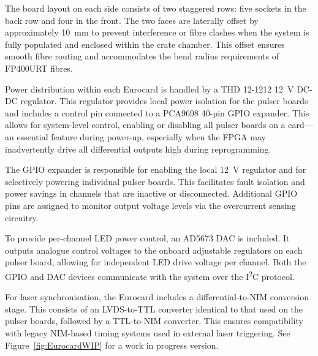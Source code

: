 \documentclass[a4paper,11pt]{article}
\begin{document}
The board layout on each side consists of two staggered rows: five sockets in the back row and four in the front. The two faces are laterally offset by approximately \SI{10}{\milli\metre} to prevent interference or fibre clashes when the system is fully populated and enclosed within the crate chamber. This offset ensures smooth fibre routing and accommodates the bend radius requirements of FP400URT fibres.

Power distribution within each Eurocard is handled by a THD 12-1212 \cite{THD121212}\SI{12}{\volt} DC-DC regulator. This regulator provides local power isolation for the pulser boards and includes a control pin connected to a PCA9698 \cite{PCA9698} 40-pin GPIO expander. This allows for system-level control, enabling or disabling all pulser boards on a card—an essential feature during power-up, especially when the FPGA may inadvertently drive all differential outputs high during reprogramming.

The GPIO expander is responsible for enabling the local \SI{12}{\volt} regulator and for selectively powering individual pulser boards. This facilitates fault isolation and power savings in channels that are inactive or disconnected. Additional GPIO pins are assigned to monitor output voltage levels via the overcurrent sensing circuitry.

To provide per-channel LED power control, an AD5673 \cite{AD5673} DAC is included. It outputs analogue control voltages to the onboard adjustable regulators on each pulser board, allowing for independent LED drive voltage per channel. Both the GPIO and DAC devices communicate with the system over the I\textsuperscript{2}C protocol.

For laser synchronisation, the Eurocard includes a differential-to-NIM conversion stage. This consists of an LVDS-to-TTL converter identical to that used on the pulser boards, followed by a TTL-to-NIM converter. This ensures compatibility with legacy NIM-based timing systems used in external laser triggering. See Figure~\ref{fig:EurocardWIP} for a work in progress version.
\end{document}
